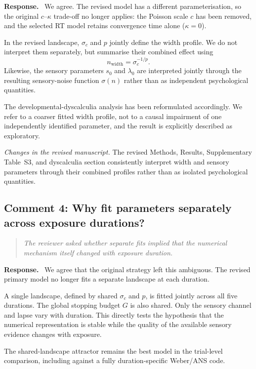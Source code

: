 \documentclass[11pt]{article}
\newenvironment{reviewercomment}{\begin{quote}\color{reviewgray}\itshape}{\end{quote}}
\newenvironment{authorresponse}{\par\noindent\textbf{\color{responseblue}Response.}\ }{\par}
\newcommand{\change}[1]{\par\noindent\textit{Changes in the revised manuscript.} #1\par}
\begin{document}
\begin{authorresponse}
We agree. The revised model has a different parameterisation, so the original $c$--$\kappa$ trade-off no longer applies: the Poisson scale $c$ has been removed, and the selected RT model retains convergence time alone ($\kappa=0$).

In the revised landscape, $\sigma_c$ and $p$ jointly define the width profile. We do not interpret them separately, but summarise their combined effect using
\[
n_{\mathrm{width}}=\sigma_c^{-1/p}.
\]
Likewise, the sensory parameters $s_0$ and $\lambda_0$ are interpreted jointly through the resulting sensory-noise function $\sigma(n)$ rather than as independent psychological quantities.

The developmental-dyscalculia analysis has been reformulated accordingly. We refer to a coarser fitted width profile, not to a causal impairment of one independently identified parameter, and the result is explicitly described as exploratory.
\end{authorresponse}

\change{The revised Methods, Results, Supplementary Table~S3, and dyscalculia section consistently interpret width and sensory parameters through their combined profiles rather than as isolated psychological quantities.}

\subsection*{Comment 4: Why fit parameters separately across exposure durations?}

\begin{reviewercomment}
The reviewer asked whether separate fits implied that the numerical mechanism itself changed with exposure duration.
\end{reviewercomment}

\begin{authorresponse}
We agree that the original strategy left this ambiguous. The revised primary model no longer fits a separate landscape at each duration.

A single landscape, defined by shared $\sigma_c$ and $p$, is fitted jointly across all five durations. The global stopping budget $G$ is also shared. Only the sensory channel and lapse vary with duration. This directly tests the hypothesis that the numerical representation is stable while the quality of the available sensory evidence changes with exposure.

The shared-landscape attractor remains the best model in the trial-level comparison, including against a fully duration-specific Weber/ANS code.
\end{authorresponse}
\end{document}
